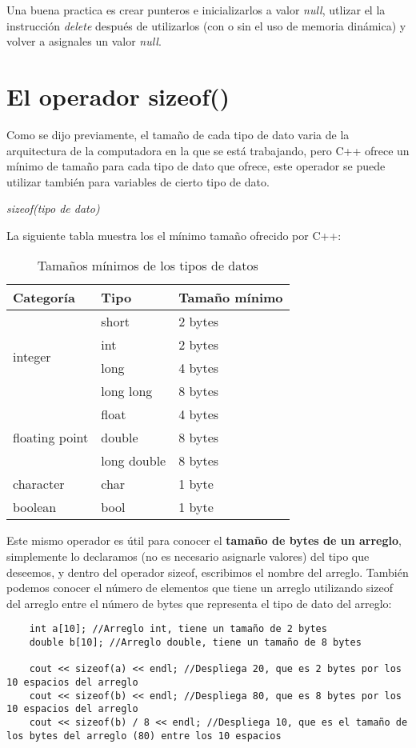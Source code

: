 Una buena practica es crear punteros e inicializarlos a valor \textit{null}, utlizar el la instrucción \textit{delete} después de utilizarlos (con o sin el uso de memoria dinámica) y volver a asignales un valor \textit{null}.



\section{El operador sizeof()}
Como se dijo previamente, el tamaño de cada tipo de dato varia de la arquitectura de la computadora en la que se está trabajando, pero C++ ofrece un mínimo de tamaño para cada tipo de dato que ofrece, este operador se puede utilizar también para variables de cierto tipo de dato.\begin{center}\textit{sizeof(tipo de dato)}\end{center}
La siguiente tabla muestra los el mínimo tamaño ofrecido por C++:
\begin{table}[ht]
    \begin{center}
        \caption{Tamaños mínimos de los tipos de datos}
        \label{tab: 6}
        \begin{tabular}{m{3cm} m{3cm} m{3cm}}
            \hline
            \textbf{Categoría}&\textbf{Tipo}&\textbf{Tamaño mínimo} \\
            \hline
            \multirow{4}{3cm}{integer}&short&2 bytes \\
            &int&2 bytes \\
            &long&4 bytes \\
            &long long&8 bytes \\ \hline
            \multirow{3}{3cm}{floating point}&float&4 bytes \\
            &double&8 bytes \\
            &long double&8 bytes \\ \hline
            character&char&1 byte \\ \hline
            boolean&bool&1 byte \\
            \hline
        \end{tabular}
    \end{center}    
\end{table}
Este mismo operador es útil para conocer el \textbf{tamaño de bytes de un arreglo}, simplemente lo declaramos (no es necesario asignarle valores) del tipo que deseemos, y dentro del operador sizeof, escribimos el nombre del arreglo. También podemos conocer el número de elementos que tiene un arreglo utilizando sizeof del arreglo entre el número de bytes que representa el tipo de dato del arreglo:
\begin{lstlisting}
    int a[10]; //Arreglo int, tiene un tamaño de 2 bytes
    double b[10]; //Arreglo double, tiene un tamaño de 8 bytes
    
    cout << sizeof(a) << endl; //Despliega 20, que es 2 bytes por los 10 espacios del arreglo
    cout << sizeof(b) << endl; //Despliega 80, que es 8 bytes por los 10 espacios del arreglo
    cout << sizeof(b) / 8 << endl; //Despliega 10, que es el tamaño de los bytes del arreglo (80) entre los 10 espacios
\end{lstlisting}